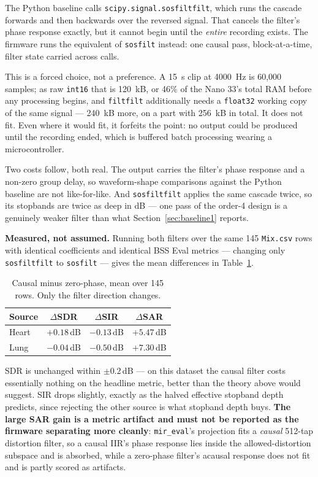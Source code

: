 \documentclass[11pt]{article}
\begin{document}
The Python baseline calls \texttt{scipy.signal.sosfiltfilt}, which runs the
cascade forwards and then backwards over the reversed signal. That cancels
the filter's phase response exactly, but it cannot begin until the
\emph{entire} recording exists. The firmware runs the equivalent of
\texttt{sosfilt} instead: one causal pass, block-at-a-time, filter state
carried across calls.

This is a forced choice, not a preference. A 15~s clip at 4000~Hz is 60{,}000
samples; as raw \texttt{int16} that is 120~kB, or 46\% of the Nano 33's total
RAM before any processing begins, and \texttt{filtfilt} additionally needs a
\texttt{float32} working copy of the same signal --- 240~kB more, on a part
with 256~kB in total. It does not fit. Even where it would fit, it forfeits
the point: no output could be produced until the recording ended, which is
buffered batch processing wearing a microcontroller.

Two costs follow, both real. The output carries the filter's phase response
and a non-zero group delay, so waveform-shape comparisons against the Python
baseline are not like-for-like. And \texttt{sosfiltfilt} applies the same
cascade twice, so its stopbands are twice as deep in dB --- one pass of the
order-4 design is a genuinely weaker filter than what Section~\ref{sec:baseline1}
reports.

\textbf{Measured, not assumed.} Running both filters over the same 145
\texttt{Mix.csv} rows with identical coefficients and identical BSS Eval
metrics --- changing only \texttt{sosfiltfilt} to \texttt{sosfilt} --- gives
the mean differences in Table~\ref{tab:causal}.

\begin{table}[H]
\centering
\caption{Causal minus zero-phase, mean over 145 rows. Only the filter direction changes.}
\label{tab:causal}
\begin{tabular}{@{}lccc@{}}
\toprule
Source & $\Delta$SDR & $\Delta$SIR & $\Delta$SAR \\
\midrule
Heart & $+0.18$\,dB & $-0.13$\,dB & $+5.47$\,dB \\
Lung  & $-0.04$\,dB & $-0.50$\,dB & $+7.30$\,dB \\
\bottomrule
\end{tabular}
\end{table}

SDR is unchanged within $\pm0.2$\,dB --- on this dataset the causal filter
costs essentially nothing on the headline metric, better than the theory
above would suggest. SIR drops slightly, exactly as the halved effective
stopband depth predicts, since rejecting the other source is what stopband
depth buys. \textbf{The large SAR gain is a metric artifact and must not be
reported as the firmware separating more cleanly}: \texttt{mir\_eval}'s
projection fits a \emph{causal} 512-tap distortion filter, so a causal IIR's
phase response lies inside the allowed-distortion subspace and is absorbed,
while a zero-phase filter's acausal response does not fit and is partly
scored as artifacts.
\end{document}
